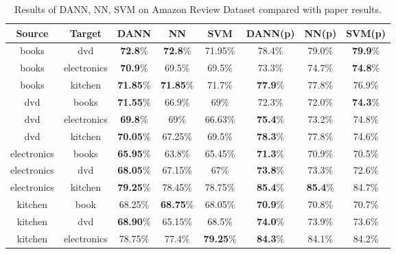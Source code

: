 \documentclass{article}
\begin{document}
\begin{table}
  \centering
  \begin{tabular}{|c|c|c|c|c|c|c|c|}
  \hline
  Source & Target & DANN & NN & SVM & DANN(p) & NN(p) & SVM(p) \\ \hline
  books & dvd & \textbf{72.8}\% & \textbf{72.8}\% & 71.95\% & 78.4\% & 79.0\% & \textbf{79.9}\% \\ \hline
  books & electronics & \textbf{70.9}\% & 69.5\% & 69.5\% & 73.3\% & 74.7\% & \textbf{74.8}\% \\ \hline
  books & kitchen & \textbf{71.85}\% & \textbf{71.85}\% & 71.7\% & \textbf{77.9}\% & 77.8\% & 76.9\% \\ \hline
  dvd & books & \textbf{71.55}\% & 66.9\% & 69\% & 72.3\% & 72.0\% & \textbf{74.3}\% \\ \hline
  dvd & electronics & \textbf{69.8}\% & 69\% & 66.63\% & \textbf{75.4}\% & 73.2\% & 74.8\% \\ \hline
  dvd & kitchen & \textbf{70.05}\% & 67.25\% & 69.5\% & \textbf{78.3}\% & 77.8\% & 74.6\% \\ \hline
  electronics & books & \textbf{65.95}\% & 63.8\% & 65.45\% & \textbf{71.3}\% & 70.9\% & 70.5\% \\ \hline
  electronics & dvd & \textbf{68.05}\% & 67.15\% & 67\% & \textbf{73.8}\% & 73.3\% & 72.6\% \\ \hline
  electronics & kitchen & \textbf{79.25}\% & 78.45\% & 78.75\% & \textbf{85.4}\% & \textbf{85.4}\% & 84.7\% \\ \hline
  kitchen & book & 68.25\% & \textbf{68.75}\% & 68.05\% & \textbf{70.9}\% & 70.8\% & 70.7\% \\ \hline
  kitchen & dvd & \textbf{68.90}\% & 65.15\% & 68.5\% & \textbf{74.0}\% & 73.9\% & 73.6\% \\ \hline
  kitchen & electronics & 78.75\% & 77.4\% & \textbf{79.25}\% & \textbf{84.3}\% & 84.1\% & 84.2\% \\ \hline
  \end{tabular}
  \caption{Results of DANN, NN, SVM on Amazon Review Dataset compared with paper results.}
  \label{tab:DANN_Sentiment}
\end{table}



\end{document}
